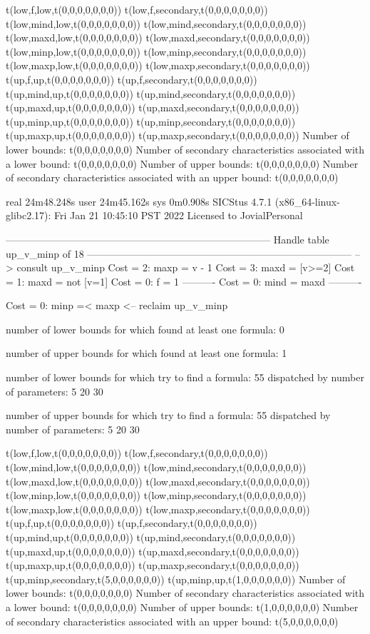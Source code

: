 t(low,f,low,t(0,0,0,0,0,0,0))
t(low,f,secondary,t(0,0,0,0,0,0,0))
t(low,mind,low,t(0,0,0,0,0,0,0))
t(low,mind,secondary,t(0,0,0,0,0,0,0))
t(low,maxd,low,t(0,0,0,0,0,0,0))
t(low,maxd,secondary,t(0,0,0,0,0,0,0))
t(low,minp,low,t(0,0,0,0,0,0,0))
t(low,minp,secondary,t(0,0,0,0,0,0,0))
t(low,maxp,low,t(0,0,0,0,0,0,0))
t(low,maxp,secondary,t(0,0,0,0,0,0,0))
t(up,f,up,t(0,0,0,0,0,0,0))
t(up,f,secondary,t(0,0,0,0,0,0,0))
t(up,mind,up,t(0,0,0,0,0,0,0))
t(up,mind,secondary,t(0,0,0,0,0,0,0))
t(up,maxd,up,t(0,0,0,0,0,0,0))
t(up,maxd,secondary,t(0,0,0,0,0,0,0))
t(up,minp,up,t(0,0,0,0,0,0,0))
t(up,minp,secondary,t(0,0,0,0,0,0,0))
t(up,maxp,up,t(0,0,0,0,0,0,0))
t(up,maxp,secondary,t(0,0,0,0,0,0,0))
Number of lower bounds:                                             t(0,0,0,0,0,0,0)
Number of secondary characteristics associated with a lower bound:  t(0,0,0,0,0,0,0)
Number of upper bounds:                                             t(0,0,0,0,0,0,0)
Number of secondary characteristics associated with an upper bound: t(0,0,0,0,0,0,0)

real	24m48.248s
user	24m45.162s
sys	0m0.908s
SICStus 4.7.1 (x86_64-linux-glibc2.17): Fri Jan 21 10:45:10 PST 2022
Licensed to JovialPersonal


--------------------------------------------------------------------------------
Handle table up_v_minp of 18
--------------------------------------------------------------------------------
--> consult up_v_minp
Cost =  2:  maxp = v - 1
Cost =  3:  maxd = [v>=2]
Cost =  1:  maxd = not [v=1]
Cost =  0:  f    = 1
----------
Cost =  0:  mind = maxd
----------

Cost =  0:  minp =< maxp
<-- reclaim up_v_minp

number of lower bounds for which found at least one formula: 0

number of upper bounds for which found at least one formula: 1

number of lower bounds for which try to find a formula: 55
dispatched by number of parameters: 5  20  30

number of upper bounds for which try to find a formula: 55
dispatched by number of parameters: 5  20  30

t(low,f,low,t(0,0,0,0,0,0,0))
t(low,f,secondary,t(0,0,0,0,0,0,0))
t(low,mind,low,t(0,0,0,0,0,0,0))
t(low,mind,secondary,t(0,0,0,0,0,0,0))
t(low,maxd,low,t(0,0,0,0,0,0,0))
t(low,maxd,secondary,t(0,0,0,0,0,0,0))
t(low,minp,low,t(0,0,0,0,0,0,0))
t(low,minp,secondary,t(0,0,0,0,0,0,0))
t(low,maxp,low,t(0,0,0,0,0,0,0))
t(low,maxp,secondary,t(0,0,0,0,0,0,0))
t(up,f,up,t(0,0,0,0,0,0,0))
t(up,f,secondary,t(0,0,0,0,0,0,0))
t(up,mind,up,t(0,0,0,0,0,0,0))
t(up,mind,secondary,t(0,0,0,0,0,0,0))
t(up,maxd,up,t(0,0,0,0,0,0,0))
t(up,maxd,secondary,t(0,0,0,0,0,0,0))
t(up,maxp,up,t(0,0,0,0,0,0,0))
t(up,maxp,secondary,t(0,0,0,0,0,0,0))
t(up,minp,secondary,t(5,0,0,0,0,0,0))
t(up,minp,up,t(1,0,0,0,0,0,0))
Number of lower bounds:                                             t(0,0,0,0,0,0,0)
Number of secondary characteristics associated with a lower bound:  t(0,0,0,0,0,0,0)
Number of upper bounds:                                             t(1,0,0,0,0,0,0)
Number of secondary characteristics associated with an upper bound: t(5,0,0,0,0,0,0)


